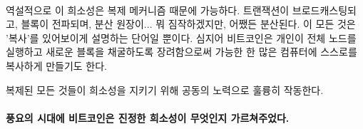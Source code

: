 \paragraph{}
역설적으로 이 희소성은 복제 메커니즘 때문에 가능하다. 
트랜잭션이 브로드캐스팅되고, 블록이 전파되며, 분산 원장이... 뭐 짐작하겠지만, 어쨌든 분산된다.
이 모든 것은 '복사'를 있어보이게 설명하는 단어일 뿐이다.
심지어 비트코인은 개인이 전체 노드를 실행하고 새로운 블록을 채굴하도록 장려함으로써 
가능한 한 많은 컴퓨터에 스스로를 복사하게 만들기도 한다. 

복제된 모든 것들이 희소성을 지키기 위해 공동의 노력으로 훌륭히 작동한다.

\paragraph{풍요의 시대에 비트코인은 진정한 희소성이 무엇인지 가르쳐주었다.}

%
%
%
%
%
%
%
